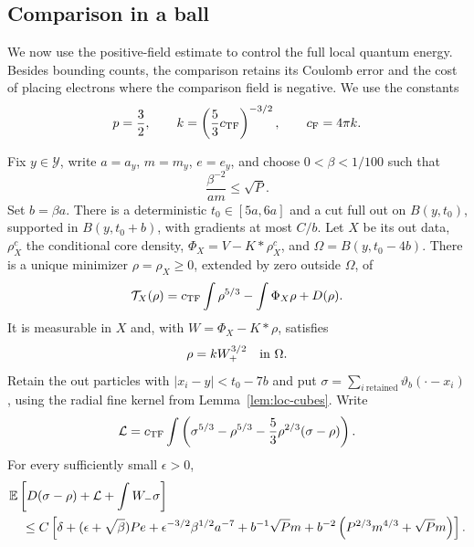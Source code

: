 \subsection{Comparison in a ball}

We now use the positive-field estimate to control the full local
quantum energy.  Besides bounding counts, the comparison retains its
Coulomb error and the cost of placing electrons where the comparison
field is negative.  We use the constants
\[
 p=\frac32,\qquad k=\left(\frac53c_{\mathrm{TF}}\right)^{-3/2},\qquad c_{\mathrm F}=4\pi k.
\]

\begin{lemma}\label{m:lem:screen-patch}\label{a:lem:screen-patch}
Fix $y\in\mathcal Y$, write $a=a_y$, $m=m_y$, $e=e_y$, and choose
$0<\beta<1/100$ such that
\begin{equation}\label{m:eq:screen-patch-condition}
 \frac{\beta^{-2}}{am}\le\sqrt P.
\end{equation}
Set $b=\beta a$.  There is a deterministic $t_0\in[5a,6a]$ and a cut full out on
$B(y,t_0)$, supported in $B(y,t_0+b)$, with gradients at most $C/b$.
Let $X$ be its out data, $\rho_X^c$ the conditional core density,
$\Phi_X=V-K*\rho_X^c$, and $\Omega=B(y,t_0-4b)$.
There is a unique minimizer $\rho=\rho_X\ge0$, extended by zero
outside $\Omega$, of
\begin{equation}\label{m:eq:screen-tf-functional}
 \mathcal T_X(\rho)=c_{\mathrm{TF}}\int\rho^{5/3}-\int\Phi_X\rho+D(\rho).
\end{equation}
It is measurable in $X$ and, with $W=\Phi_X-K*\rho$, satisfies
\begin{equation}\label{m:eq:screen-tf-equation}
 \rho=kW_+^{3/2}\quad\hbox{in }\Omega.
\end{equation}
Retain the out particles with $|x_i-y|<t_0-7b$ and put
$\sigma=\sum_{i\ \mathrm{retained}}\vartheta_b(\cdot-x_i)$, using the
radial fine kernel from Lemma~\ref{lem:loc-cubes}.  Write
\begin{equation}\label{m:eq:screen-remainder}
 \mathcal L=c_{\mathrm{TF}}\int\left(\sigma^{5/3}-\rho^{5/3}
              -\frac53\rho^{2/3}(\sigma-\rho)\right).
\end{equation}
For every sufficiently small $\epsilon>0$,
\begin{align}\label{m:eq:screen-comparison}
 &\E\left[D(\sigma-\rho)+\mathcal L+\int W_-\sigma\right]\\
 &\quad\le C\left[\delta+(\epsilon+\sqrt\beta)Pe
       +\epsilon^{-3/2}\beta^{1/2}a^{-7}
       +b^{-1}\sqrt Pm
       +b^{-2}\left(P^{2/3}m^{4/3}+\sqrt Pm\right)\right].\notag

\end{align}
\end{lemma}
